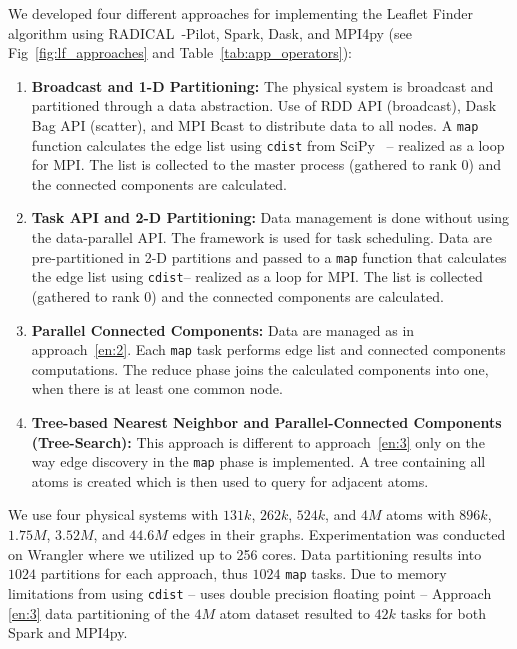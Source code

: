We developed four different approaches for implementing the Leaflet Finder algorithm using RADICAL~-Pilot, Spark, Dask, and MPI4py (see Fig~\ref{fig:lf_approaches} and Table~\ref{tab:app_operators}):
\begin{enumerate}[1)]
    \item \textbf{Broadcast and 1-D Partitioning:}
    The physical system is broadcast and partitioned through a data abstraction.
    Use of RDD API (broadcast), Dask Bag API (scatter), and MPI Bcast to distribute data to all nodes.
    A \texttt{map} function calculates the edge list using \texttt{cdist} from SciPy~\cite{scipy} -- realized as a loop for MPI.
    The list is collected to the master process (gathered to rank 0) and the connected components are calculated.\label{en:1}
    \item \textbf{Task API and 2-D Partitioning:}
    Data management is done without using the data-parallel API.
    The framework is used for task scheduling.
    Data are pre-partitioned in 2-D partitions and passed to a \texttt{map} function that calculates the edge list using \texttt{cdist}-- realized as a loop for MPI.
    The list is collected (gathered to rank 0) and the connected components are calculated.\label{en:2}
    \item \textbf{Parallel Connected Components:}
    Data are managed as in approach~\ref{en:2}.
    Each \texttt{map} task performs edge list and connected components computations.
    The reduce phase joins the calculated components into one, when there is at least one common node.\label{en:3}
    \item \textbf{Tree-based Nearest Neighbor and Parallel-Connected Components (Tree-Search):}
    This approach is different to approach~\ref{en:3} only on the way edge discovery in the \texttt{map} phase is implemented.
    A tree containing all atoms is created which is then used to query for adjacent atoms.\label{en:4}
\end{enumerate}

We use four physical systems with $131k$, $262k$, $524k$, and $4M$ atoms with $896k$, $1.75M$, $3.52M$, and $44.6M$ edges in their graphs.
Experimentation was conducted on Wrangler where we utilized up to 256 cores.
Data partitioning results into $1024$ partitions for each approach, thus $1024$ \texttt{map} tasks.
Due to memory limitations from using \texttt{cdist} -- uses double precision floating point -- Approach \ref{en:3} data partitioning of the $4M$ atom dataset resulted to $42k$ tasks for both Spark and MPI4py.

